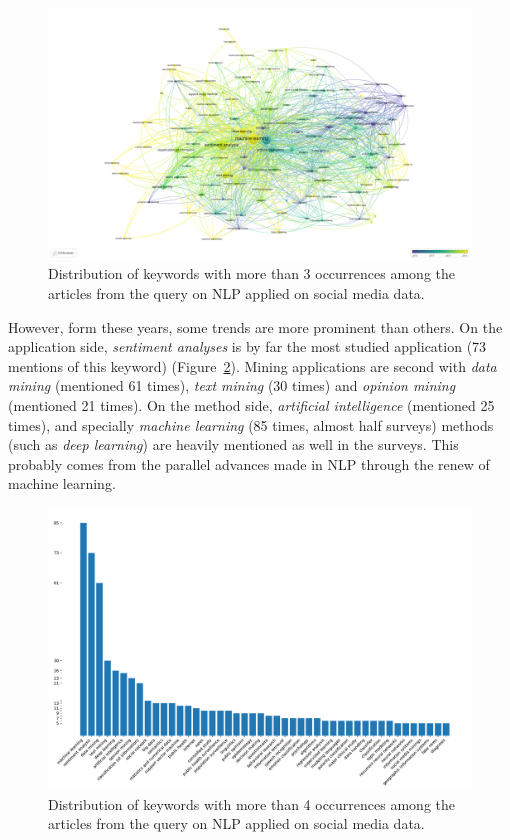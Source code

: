 \begin{landscape}
    \begin{figure}[htb]
        \includegraphics[width=\paperwidth,height=\paperheight,keepaspectratio]{figures/chap-2/nlp-overlay.pdf}
        \caption{Distribution of keywords with more than 3 occurrences among the articles from the query on NLP applied on social media data.}
        \label{literature:nlp-overlay}
    \end{figure}
\end{landscape}

However, form these years, some trends are more prominent than others.
On the application side, \emph{sentiment analyses} is by far the most studied application (73 mentions of this keyword) (Figure~\ref{literature:nlp-bar}).
Mining applications are second with \emph{data mining} (mentioned 61 times), \emph{text mining} (30 times) and \emph{opinion mining} (mentioned 21 times).
On the method side, \emph{artificial intelligence} (mentioned 25 times), and specially \emph{machine learning} (85 times, almost half surveys) methods (such as \emph{deep learning}) are heavily mentioned as well in the surveys.
This probably comes from the parallel advances made in NLP through the renew of machine learning.

\begin{figure}[htb]
    \centering
    \includegraphics[width=\textwidth]{figures/chap-2/nlp-bar.pdf}
    \caption{Distribution of keywords with more than 4 occurrences among the articles from the query on NLP applied on social media data.}
    \label{literature:nlp-bar}
\end{figure}

